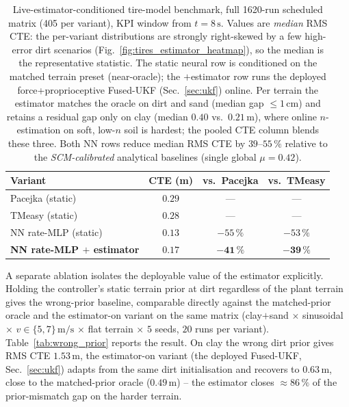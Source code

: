 \documentclass[conference,letterpaper,10pt]{IEEEtran}
\begin{document}
\begin{table}[!t]
  \renewcommand{\arraystretch}{1.15}
  \caption{Live-estimator-conditioned tire-model benchmark, full
    1620-run scheduled matrix (405 per variant), KPI window from
    $t=8\,\mathrm{s}$.
    Values are \emph{median} RMS CTE: the per-variant distributions are
    strongly right-skewed by a few high-error dirt scenarios
    (Fig.~\ref{fig:tires_estimator_heatmap}), so the median is the
    representative statistic. The static neural row is
    conditioned on the matched terrain preset (near-oracle); the
    $+$estimator row runs the deployed force+proprioceptive
    Fused-UKF (Sec.~\ref{sec:ukf}) online. Per terrain the estimator
    matches the oracle on dirt and sand (median gap $\le\!1\,\mathrm{cm}$)
    and retains a residual gap only on clay (median $0.40$ vs.\
    $0.21\,\mathrm{m}$), where online $n$-estimation on soft, low-$n$ soil
    is hardest; the pooled CTE column blends these three. Both NN rows
    reduce median RMS CTE by $39$--$55\,\%$ relative to the
    \emph{SCM-calibrated} analytical baselines (single global $\mu\!=\!0.42$).}
  \label{tab:tires_estimator}
  \centering
  \setlength{\tabcolsep}{4pt}
  \begin{tabular}{lccc}
    \toprule
    \textbf{Variant} & \textbf{CTE (m)} & \textbf{vs.\ Pacejka} & \textbf{vs.\ TMeasy}\\
    \midrule
    Pacejka (static)            & $0.29$ & ---       & ---\\
    TMeasy (static)             & $0.28$ & ---       & ---\\
    NN rate-MLP (static)        & $0.13$ & $-55\,\%$ & $-53\,\%$\\
    \textbf{NN rate-MLP $+$ estimator} & $\mathbf{0.17}$ & $\mathbf{-41\,\%}$ & $\mathbf{-39\,\%}$\\
    \bottomrule
  \end{tabular}
\end{table}

A separate ablation isolates the deployable value of the estimator
explicitly. Holding the controller's static terrain prior at dirt
regardless of the plant terrain gives the
wrong-prior baseline, comparable directly against the matched-prior
oracle and the estimator-on variant on the same matrix
(clay$+$sand $\times$ sinusoidal $\times$ $v\in\{5,7\}\,\mathrm{m/s}$
$\times$ flat terrain $\times$ $5$ seeds, $20$ runs per variant).
Table~\ref{tab:wrong_prior} reports the result. On clay the wrong
dirt prior gives RMS CTE $1.53\,\mathrm{m}$, the estimator-on variant
(the deployed Fused-UKF, Sec.~\ref{sec:ukf}) adapts from the same dirt
initialisation and recovers to $0.63\,\mathrm{m}$, close to the
matched-prior oracle ($0.49\,\mathrm{m}$) -- the estimator closes
$\approx 86\,\%$ of the prior-mismatch gap on the harder terrain.
\end{document}
